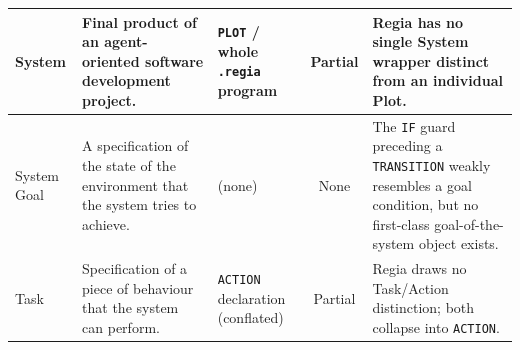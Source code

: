 \begin{longtable}{|p{}|p{}|p{}|c|p{}|}
System &
Final product of an agent-oriented software development project. &
\lstinline|PLOT| / whole \lstinline|.regia| program &
Partial &
Regia has no single System wrapper distinct from an individual Plot. \\
\hline

System Goal &
A specification of the state of the environment that the system tries to achieve. &
(none) &
None &
The \lstinline|IF| guard preceding a \lstinline|TRANSITION| weakly resembles a goal condition, but no first-class goal-of-the-system object exists. \\
\hline

Task &
Specification of a piece of behaviour that the system can perform. &
\lstinline|ACTION| declaration (conflated) &
Partial &
Regia draws no Task/Action distinction; both collapse into \lstinline|ACTION|. \\
\hline

\end{longtable}

